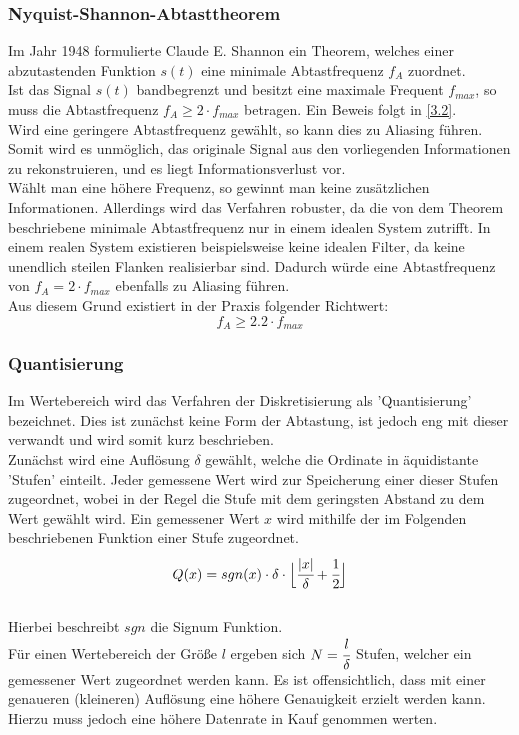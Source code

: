 \subsubsection{Nyquist-Shannon-Abtasttheorem}
Im Jahr 1948 formulierte Claude E. Shannon ein Theorem, welches einer abzutastenden Funktion $s(t)$ eine minimale Abtastfrequenz $f_A$ zuordnet.\\
Ist das Signal $s(t)$ bandbegrenzt und besitzt eine maximale Frequent $f_{max}$, so muss die Abtastfrequenz $f_A \geq 2 \cdot f_{max}$ betragen. Ein Beweis folgt in \ref{3.2}.\\
Wird eine geringere Abtastfrequenz gewählt, so kann dies zu Aliasing führen. Somit wird es unmöglich, das originale Signal aus den vorliegenden Informationen zu rekonstruieren, und es liegt Informationsverlust vor.\\
Wählt man eine höhere Frequenz, so gewinnt man keine zusätzlichen Informationen. Allerdings wird das Verfahren robuster, da die von dem Theorem beschriebene minimale Abtastfrequenz nur in einem idealen System zutrifft. In einem realen System existieren beispielsweise keine idealen Filter, da keine unendlich steilen Flanken realisierbar sind. Dadurch würde eine Abtastfrequenz von $f_A = 2 \cdot f_{max}$ ebenfalls zu Aliasing führen.\\
Aus diesem Grund existiert in der Praxis folgender Richtwert:\\
$$f_A \geq 2.2 \cdot f_{max}$$


\subsubsection{Quantisierung}
Im Wertebereich wird das Verfahren der Diskretisierung als 'Quantisierung' bezeichnet. Dies ist zunächst keine Form der Abtastung, ist jedoch eng mit dieser verwandt und wird somit kurz beschrieben.\\

Zunächst wird eine Auflösung $\delta$ gewählt, welche die Ordinate in äquidistante 'Stufen' einteilt. Jeder gemessene Wert wird zur Speicherung einer dieser Stufen zugeordnet, wobei in der Regel die Stufe mit dem geringsten Abstand zu dem Wert gewählt wird. Ein gemessener Wert $x$ wird mithilfe der im Folgenden beschriebenen Funktion einer Stufe zugeordnet.\\
$$Q(x) = sgn(x) \cdot \delta \cdot \Big\lfloor \cfrac{|x|}{\delta} + \cfrac{1}{2} \Big\rfloor $$\\
Hierbei beschreibt $sgn$ die Signum Funktion.\\
Für einen Wertebereich der Größe $l$ ergeben sich $N = \cfrac{l}{\delta}$ Stufen, welcher ein gemessener Wert zugeordnet werden kann. Es ist offensichtlich, dass mit einer genaueren (kleineren) Auflösung eine höhere Genauigkeit erzielt werden kann. Hierzu muss jedoch eine höhere Datenrate in Kauf genommen werten.


